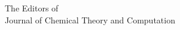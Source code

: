 \documentclass{letter}
\begin{document}
\begin{letter}{
    The Editors of\\
    Journal of Chemical Theory and Computation\\
    \vskip 1cm
  }








\end{letter}
\end{document}
